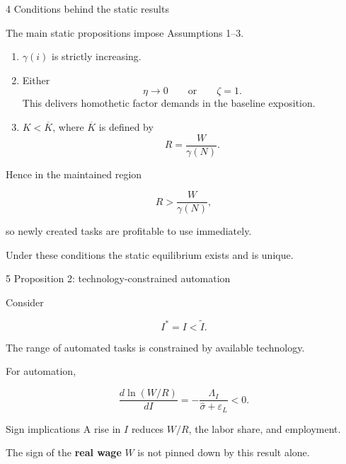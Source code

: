 \documentclass[aspectratio=169,11pt]{beamer}
\begin{document}

\begin{frame}{4 \textperiodcentered{} Conditions behind the static results}

  The main static propositions impose Assumptions 1--3.

  \begin{enumerate}\small

    \item $\gamma(i)$ is strictly increasing.

    \item Either
    \[
      \eta\to0
      \qquad\text{or}\qquad
      \zeta=1.
    \]
    This delivers homothetic factor demands in the baseline exposition.

    \item $K<\overline K$, where $\overline K$ is defined by
    \[
      R=\frac{W}{\gamma(N)}.
    \]

  \end{enumerate}

  Hence in the maintained region

  \[
    R>\frac{W}{\gamma(N)},
  \]

  so newly created tasks are profitable to use immediately.

  \medskip

  Under these conditions the static equilibrium exists and is unique.

\end{frame}


\begin{frame}{5 \textperiodcentered{} Proposition 2: technology-constrained automation}

  Consider

  \[
    I^*=I<\widetilde I.
  \]

  The range of automated tasks is constrained by available technology.

  For automation,

  \[
    \frac{d\ln(W/R)}{dI}
    =
    -\frac{\Lambda_I}
    {\widehat\sigma+\varepsilon_L}
    <0.
  \]

  \begin{block}{Sign implications}
    A rise in $I$ reduces $W/R$, the labor share, and employment.
  \end{block}

  The sign of the \textbf{real wage} $W$ is not pinned down by
  this result alone.

\end{frame}
\end{document}
